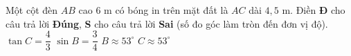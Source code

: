 \begin{ex}%
	Một cột đèn $AB$ cao $6$ m có bóng in trên mặt đất là $AC$ dài $4{,}5$ m. Điền \textbf{Đ} cho câu trả lời \textbf{Đúng}, \textbf{S} cho câu trả lời \textbf{Sai} (số đo góc làm tròn đến đơn vị độ).
	\choiceTF
	{\True $\tan C = \dfrac{4}{3}$}
	{$\sin B = \dfrac{3}{4}$}
	{$B \approx 53^\circ$}
	{\True $C \approx 53^\circ$}

\end{ex}
